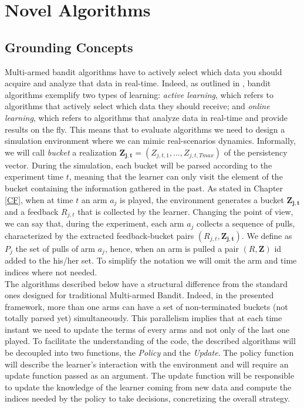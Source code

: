 \chapter{Novel Algorithms}\label{C10}



\section{Grounding Concepts}

Multi-armed bandit algorithms have to actively select which data you should acquire and analyze that data in real-time. Indeed, as outlined in \cite{banditalgowebopt}, bandit algorithms exemplify two types of learning: \emph{active learning}, which refers to algorithms that actively select which data they should receive; and \emph{online learning}, which refers to algorithms that analyze data in real-time and provide results on the fly. This means that to evaluate algorithms we need to design a simulation environment where we can mimic real-scenarios dynamics. Informally, we will call \emph{bucket} a realization $\boldsymbol{Z_{j,t}}= (Z_{j,t,1},\dots, Z_{j,t,Tmax})$ of the persistency vector. During the simulation, each bucket will be parsed according to the experiment time $t$, meaning that the learner can only visit the element of the bucket containing the information gathered in the past. As stated in Chapter \ref{CF}, when at time $t$ an arm $a_j$ is played, the environment generates a bucket $\boldsymbol{Z_{j,t}}$ and a feedback $R_{j,t}$ that is collected by the learner.
Changing the point of view, we can say that, during the experiment, each arm $a_j$ collects a sequence of pulls, characterized by the extracted feedback-bucket pairs $(R_ {j, t}, \boldsymbol{Z_ {j, t}})$. We define as $P_j$ the set of pulls of arm $a_j$, hence, when an arm is pulled a pair $(R, \boldsymbol{Z})$ id added to the his/her set. To simplify the notation we will omit the arm and time indices where not needed.\\
The algorithms described below have a structural difference from the standard ones designed for traditional Multi-armed Bandit. Indeed, in the presented framework, more than one arms can have a set of non-terminated buckets (not totally parsed yet) simultaneously.  This parallelism implies that at each time instant we need to update the terms of every arms and not only of the last one played. To facilitate the understanding of the code, the described algorithms will be decoupled into two functions, the \emph{Policy} and the \emph{Update}. The policy function will describe the learner's interaction with the environment and will require an update function passed as an argument. The update function will be responsible to update the knowledge of the learner coming from new data and compute the indices needed by the policy to take decisions, concretizing the overall strategy.
